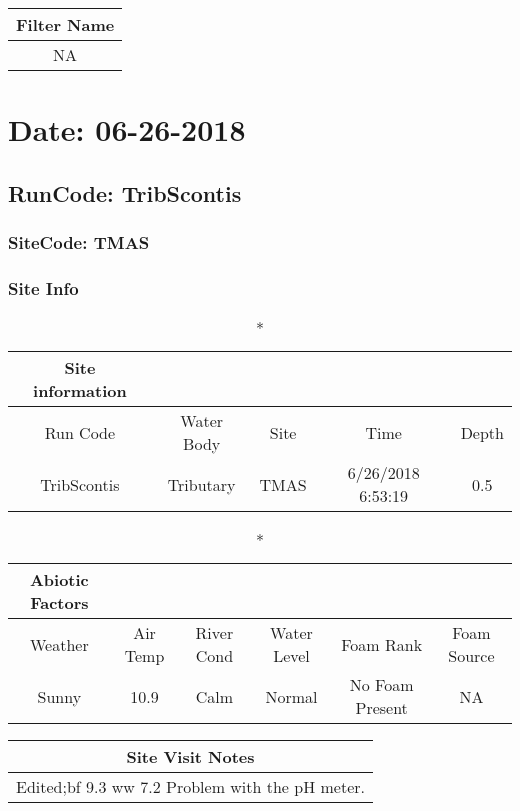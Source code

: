 \documentclass[
  letterpaper,
  DIV=11,
  numbers=noendperiod]{scrartcl}
\begin{document}
\begin{longtable*}{c}
\toprule
Filter Name \\ 
\midrule\addlinespace[2.5pt]
NA \\ 
\bottomrule
\end{longtable*}

\hypertarget{date-06-26-2018-1}{%
\section{Date: 06-26-2018}\label{date-06-26-2018-1}}

\hypertarget{runcode-tribscontis-1}{%
\subsection{RunCode: TribScontis}\label{runcode-tribscontis-1}}

\hypertarget{sitecode-tmas}{%
\subsubsection{SiteCode: TMAS}\label{sitecode-tmas}}

\subsubsection{Site Info}

\begin{longtable*}{ccccc}
\caption*{
{\large Site information}
} \\ 
\toprule
Run Code & Water Body & Site & Time & Depth \\ 
\midrule\addlinespace[2.5pt]
TribScontis & Tributary & TMAS & 6/26/2018 6:53:19 & 0.5 \\ 
\bottomrule
\end{longtable*}

\begin{longtable*}{cccccc}
\caption*{
{\large Abiotic Factors}
} \\ 
\toprule
Weather & Air Temp & River Cond & Water Level & Foam Rank & Foam Source \\ 
\midrule\addlinespace[2.5pt]
Sunny & 10.9 & Calm & Normal & No Foam Present & NA \\ 
\bottomrule
\end{longtable*}

\begin{longtable*}{c}
\toprule
Site Visit Notes \\ 
\midrule\addlinespace[2.5pt]
Edited;bf 9.3
ww 7.2
Problem with the pH meter. \\ 
\bottomrule
\end{longtable*}
\end{document}
